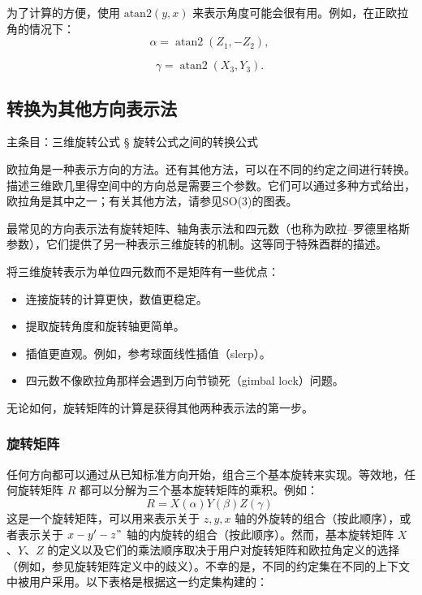为了计算的方便，使用 \( \text{atan2}(y, x) \) 来表示角度可能会很有用。例如，在正欧拉角的情况下：
\[
\alpha = \operatorname{atan2}(Z_1, -Z_2),~
\]

\[
\gamma = \operatorname{atan2}(X_3, Y_3).~
\]
\subsection{转换为其他方向表示法} 
主条目：三维旋转公式 § 旋转公式之间的转换公式  

欧拉角是一种表示方向的方法。还有其他方法，可以在不同的约定之间进行转换。描述三维欧几里得空间中的方向总是需要三个参数。它们可以通过多种方式给出，欧拉角是其中之一；有关其他方法，请参见SO(3)的图表。

最常见的方向表示法有旋转矩阵、轴角表示法和四元数（也称为欧拉–罗德里格斯参数），它们提供了另一种表示三维旋转的机制。这等同于特殊酉群的描述。

将三维旋转表示为单位四元数而不是矩阵有一些优点：
\begin{itemize}
\item 连接旋转的计算更快，数值更稳定。
\item 提取旋转角度和旋转轴更简单。
\item 插值更直观。例如，参考球面线性插值（slerp）。
\item 四元数不像欧拉角那样会遇到万向节锁死（gimbal lock）问题。
\end{itemize}
无论如何，旋转矩阵的计算是获得其他两种表示法的第一步。
\subsubsection{旋转矩阵}  
任何方向都可以通过从已知标准方向开始，组合三个基本旋转来实现。等效地，任何旋转矩阵 \( R \) 都可以分解为三个基本旋转矩阵的乘积。例如：
\[
R = X(\alpha) Y(\beta) Z(\gamma)~
\]
这是一个旋转矩阵，可以用来表示关于 $z,y,x$ 轴的外旋转的组合（按此顺序），或者表示关于 $x-y'-z"$ 轴的内旋转的组合（按此顺序）。然而，基本旋转矩阵 \( X \)、\( Y \)、\( Z \) 的定义以及它们的乘法顺序取决于用户对旋转矩阵和欧拉角定义的选择（例如，参见旋转矩阵定义中的歧义）。不幸的是，不同的约定集在不同的上下文中被用户采用。以下表格是根据这一约定集构建的：

